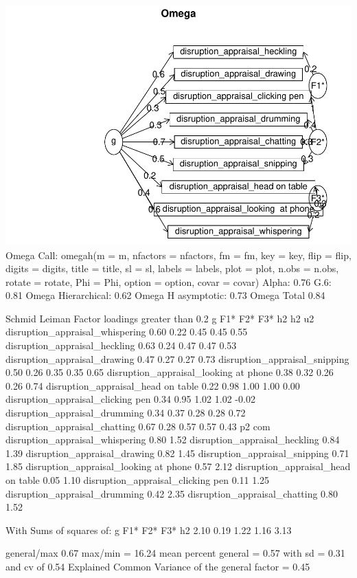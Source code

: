 \documentclass[
]{article}
\begin{document}
\includegraphics{expertise_2024_09_26_no_outlierdetection_MK_files/figure-latex/sri_omega-1.pdf}
Omega Call: omegah(m = m, nfactors = nfactors, fm = fm, key = key, flip
= flip, digits = digits, title = title, sl = sl, labels = labels, plot =
plot, n.obs = n.obs, rotate = rotate, Phi = Phi, option = option, covar
= covar) Alpha: 0.76 G.6: 0.81 Omega Hierarchical: 0.62 Omega H
asymptotic: 0.73 Omega Total 0.84

Schmid Leiman Factor loadings greater than 0.2 g F1* F2* F3* h2 h2 u2
disruption\_appraisal\_whispering 0.60 0.22 0.45 0.45 0.55
disruption\_appraisal\_heckling 0.63 0.24 0.47 0.47 0.53
disruption\_appraisal\_drawing 0.47 0.27 0.27 0.73
disruption\_appraisal\_snipping 0.50 0.26 0.35 0.35 0.65
disruption\_appraisal\_looking at phone 0.38 0.32 0.26 0.26 0.74
disruption\_appraisal\_head on table 0.22 0.98 1.00 1.00 0.00
disruption\_appraisal\_clicking pen 0.34 0.95 1.02 1.02 -0.02
disruption\_appraisal\_drumming 0.34 0.37 0.28 0.28 0.72
disruption\_appraisal\_chatting 0.67 0.28 0.57 0.57 0.43 p2 com
disruption\_appraisal\_whispering 0.80 1.52
disruption\_appraisal\_heckling 0.84 1.39 disruption\_appraisal\_drawing
0.82 1.45 disruption\_appraisal\_snipping 0.71 1.85
disruption\_appraisal\_looking at phone 0.57 2.12
disruption\_appraisal\_head on table 0.05 1.10
disruption\_appraisal\_clicking pen 0.11 1.25
disruption\_appraisal\_drumming 0.42 2.35
disruption\_appraisal\_chatting 0.80 1.52

With Sums of squares of: g F1* F2* F3* h2 2.10 0.19 1.22 1.16 3.13

general/max 0.67 max/min = 16.24 mean percent general = 0.57 with sd =
0.31 and cv of 0.54 Explained Common Variance of the general factor =
0.45
\end{document}
